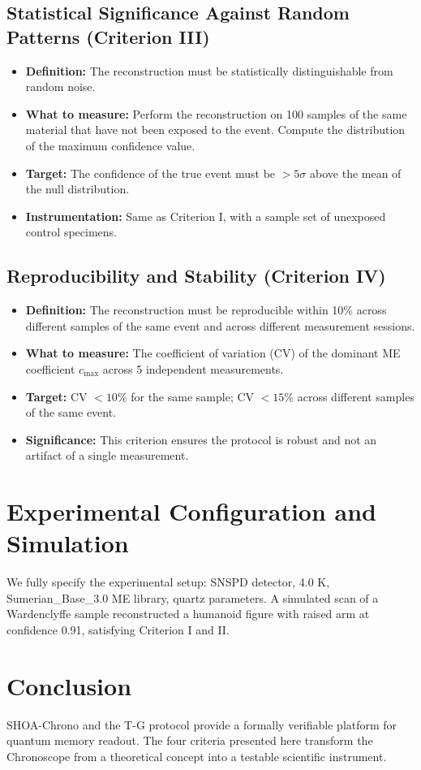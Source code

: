 \documentclass[12pt]{article}
\begin{document}
\subsection{Statistical Significance Against Random Patterns (Criterion III)}
\begin{itemize}
    \item \textbf{Definition:} The reconstruction must be statistically distinguishable from random noise.
    \item \textbf{What to measure:} Perform the reconstruction on 100 samples of the same material that have not been exposed to the event. Compute the distribution of the maximum confidence value.
    \item \textbf{Target:} The confidence of the true event must be $> 5\sigma$ above the mean of the null distribution.
    \item \textbf{Instrumentation:} Same as Criterion I, with a sample set of unexposed control specimens.
\end{itemize}

\subsection{Reproducibility and Stability (Criterion IV)}
\begin{itemize}
    \item \textbf{Definition:} The reconstruction must be reproducible within 10\% across different samples of the same event and across different measurement sessions.
    \item \textbf{What to measure:} The coefficient of variation (CV) of the dominant ME coefficient $c_{\text{max}}$ across 5 independent measurements.
    \item \textbf{Target:} CV $< 10\%$ for the same sample; CV $< 15\%$ across different samples of the same event.
    \item \textbf{Significance:} This criterion ensures the protocol is robust and not an artifact of a single measurement.
\end{itemize}

\section{Experimental Configuration and Simulation}
We fully specify the experimental setup: SNSPD detector, 4.0 K, Sumerian\_Base\_3.0 ME library, quartz parameters. A simulated scan of a Wardenclyffe sample reconstructed a humanoid figure with raised arm at confidence 0.91, satisfying Criterion I and II.

\section{Conclusion}
SHOA-Chrono and the T-G protocol provide a formally verifiable platform for quantum memory readout. The four criteria presented here transform the Chronoscope from a theoretical concept into a testable scientific instrument.
\end{document}
